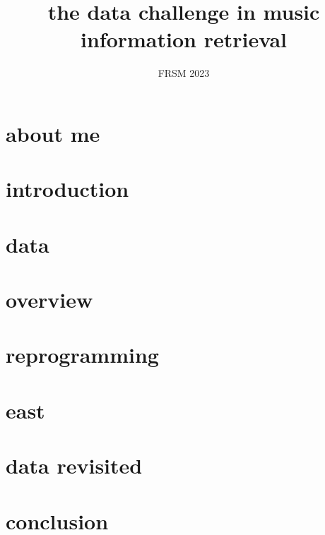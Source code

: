 

\title{the data challenge in music information retrieval}
\subtitle{FRSM 2023} 


	

    \section[about]{about me}
        
        
    \section[intro]{introduction}
        
        
    \section{data}
        
        
    \section{overview}        
		
    
    
    \section{reprogramming}
        
    
    \section{east}
        
    
    \section{data revisited}
        

    \section{conclusion}
        
        



